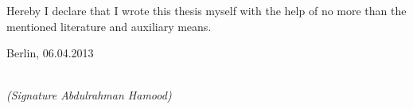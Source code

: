 \newpage

\thispagestyle{empty}

\begin{large}

\vspace*{6cm}

\noindent
Hereby I declare that I wrote this thesis myself with the help of no more than the mentioned literature and auxiliary means.
\vspace{2cm}

\noindent
Berlin, 06.04.2013

\vspace{3cm}

\hspace*{7cm}%
\dotfill\\
\hspace*{8.5cm}%
\textit{(Signature \textit{Abdulrahman Hamood})}

\end{large}
